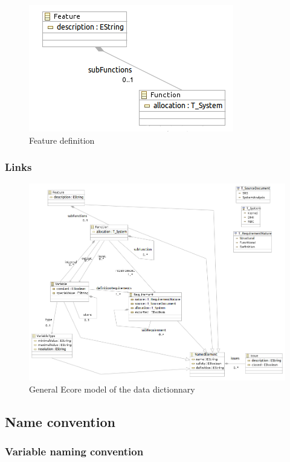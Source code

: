 \begin{figure}[ht]
  \centering
  \includegraphics{DataModel/Feature1.png}
  \caption{Feature definition}
  \label{fig:feature}
\end{figure}

\subsubsection{Links}


\begin{figure}[ht]
  \centering
  \includegraphics[width=\textwidth]{DataModel/datadictionary.png}
  \caption{General Ecore model of the data dictionnary}
  \label{fig:links}
\end{figure}

\subsection{Name convention}


\subsubsection{Variable naming convention}

